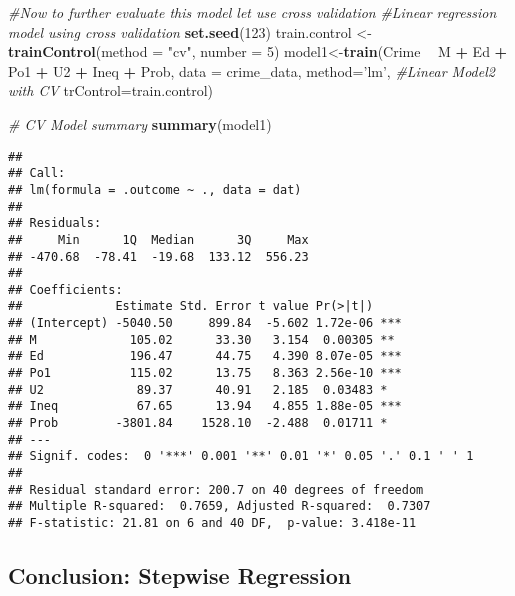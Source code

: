 \documentclass[
]{article}
\newenvironment{Shaded}{\begin{snugshade}}{\end{snugshade}}
\newcommand{\CommentTok}[1]{\textcolor[rgb]{0.56,0.35,0.01}{\textit{#1}}}
\newcommand{\DataTypeTok}[1]{\textcolor[rgb]{0.13,0.29,0.53}{#1}}
\newcommand{\DecValTok}[1]{\textcolor[rgb]{0.00,0.00,0.81}{#1}}
\newcommand{\KeywordTok}[1]{\textcolor[rgb]{0.13,0.29,0.53}{\textbf{#1}}}
\newcommand{\NormalTok}[1]{#1}
\newcommand{\OperatorTok}[1]{\textcolor[rgb]{0.81,0.36,0.00}{\textbf{#1}}}
\newcommand{\StringTok}[1]{\textcolor[rgb]{0.31,0.60,0.02}{#1}}
\begin{document}
\begin{Shaded}
\begin{Highlighting}[]
\CommentTok{#Now to further evaluate this model let use cross validation }
\CommentTok{#Linear regression model using cross validation }
\KeywordTok{set.seed}\NormalTok{(}\DecValTok{123}\NormalTok{)}
\NormalTok{train.control <-}\StringTok{ }\KeywordTok{trainControl}\NormalTok{(}\DataTypeTok{method =} \StringTok{"cv"}\NormalTok{, }\DataTypeTok{number =} \DecValTok{5}\NormalTok{)}
\NormalTok{model1<-}\KeywordTok{train}\NormalTok{(Crime }\OperatorTok{~}\StringTok{ }\NormalTok{M }\OperatorTok{+}\StringTok{ }\NormalTok{Ed }\OperatorTok{+}\StringTok{ }\NormalTok{Po1 }\OperatorTok{+}\StringTok{ }\NormalTok{U2 }\OperatorTok{+}\StringTok{ }\NormalTok{Ineq }\OperatorTok{+}\StringTok{ }\NormalTok{Prob,}
             \DataTypeTok{data =}\NormalTok{ crime_data, }\DataTypeTok{method=}\StringTok{'lm'}\NormalTok{,  }\CommentTok{#Linear Model2 with CV}
             \DataTypeTok{trControl=}\NormalTok{train.control)  }

\CommentTok{# CV Model summary}
\KeywordTok{summary}\NormalTok{(model1) }
\end{Highlighting}
\end{Shaded}

\begin{verbatim}
## 
## Call:
## lm(formula = .outcome ~ ., data = dat)
## 
## Residuals:
##     Min      1Q  Median      3Q     Max 
## -470.68  -78.41  -19.68  133.12  556.23 
## 
## Coefficients:
##             Estimate Std. Error t value Pr(>|t|)    
## (Intercept) -5040.50     899.84  -5.602 1.72e-06 ***
## M             105.02      33.30   3.154  0.00305 ** 
## Ed            196.47      44.75   4.390 8.07e-05 ***
## Po1           115.02      13.75   8.363 2.56e-10 ***
## U2             89.37      40.91   2.185  0.03483 *  
## Ineq           67.65      13.94   4.855 1.88e-05 ***
## Prob        -3801.84    1528.10  -2.488  0.01711 *  
## ---
## Signif. codes:  0 '***' 0.001 '**' 0.01 '*' 0.05 '.' 0.1 ' ' 1
## 
## Residual standard error: 200.7 on 40 degrees of freedom
## Multiple R-squared:  0.7659, Adjusted R-squared:  0.7307 
## F-statistic: 21.81 on 6 and 40 DF,  p-value: 3.418e-11
\end{verbatim}

\hypertarget{conclusion-stepwise-regression}{%
\subsection{Conclusion: Stepwise
Regression}\label{conclusion-stepwise-regression}}
\end{document}

